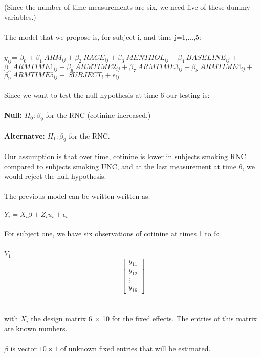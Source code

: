\documentclass[A4,12pt]{article}%
\begin{document}
\\ \\
(Since the number of time measurements are six, we need five of these dummy variables.)
\\ \\
The model that we propose is, for subject i, and time j=1,...,5:
\\ \\
$y_{ij}$= $\beta_{0} + \beta_{1} \ ARM_{ij} + \beta_{2} \ RACE_{ij} + \beta_{3} \ MENTHOL_{ij} + \beta_{4} \ BASELINE_{ij}+ $
$\beta_{5} \ ARMTIME1_{ij} + \beta_{6} \ ARMTIME2_{ij}+ \beta_{7} \ ARMTIME3_{ij}+ \beta_{8} \ ARMTIME4_{ij}+ $
$\beta_{9} \ ARMTIME5_{ij}+ \ SUBJECT_{i} + \epsilon_{ij}$
\\ \\
Since we want to test the null hypothesis at time 6 our testing is:
\\ \\
\textbf{Null:} $H_{0}: \beta_{9}$ for the RNC (cotinine increased.)
\\ \\
\textbf{Alternatve:} $H_{1}: \beta_{9}$ for the RNC.
\\ \\
Our assumption is that over time, cotinine is lower in subjects smoking RNC compared to subjects smoking UNC, and at the last measurement
at time 6, we would reject the null hypothesis.
\\ \\
The previous model can be written written as:
\\ \\
$Y_{i}= X_{i} \beta + Z_{i} u_{i} + \epsilon_{i}$ 
\\ \\
For subject one, we have six observations of cotinine at times 1 to 6:
\\ \\
$Y_{1}$ =
\[
\begin{bmatrix}
y_{1 1}
\\
y_{1 2}
\\
\vdots
\\
y_{1 6}
\end{bmatrix}
\]
\\ \\
with $X_{i}$ the design matrix 6 $\times$ 10 for the fixed effects. The entries of this matrix are known numbers.
\\ \\
$\beta$ is vector $10 \times 1$ of unknown fixed entries that will be estimated.
\\ \\
\end{document}
